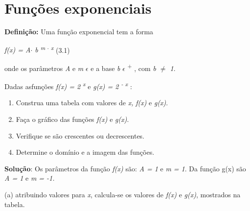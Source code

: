\section{Funções exponenciais}

\begin{caixa}
\textbf{Definição:} Uma função exponencial tem a forma

  \textit{f(x) = A$ \cdot $  b \textsuperscript{m $ \cdot $  x      }} (3.1)

onde os parâmetros  \textit{A }e \textit{m} $ \epsilon $    e a base \textit{b} $ \epsilon $  \textsuperscript{+}  , com \textit{b $ \neq $  1}.
\end{caixa}

\begin{texemplo}
Dadas asfunções   \textit{f(x) =  2\textsuperscript{ x}} e \textit{g(x) =  2\textsuperscript{ - x}} :

\begin{enumerate}
	\item Construa uma tabela com valores de \textit{x, } \textit{f(x)} e \textit{g(x)}.

	\item Faça o gráfico das funções  \textit{f(x)} e \textit{g(x)}.

	\item Verifique se são crescentes ou decrescentes.

	\item Determine o domínio e a imagem das funções.
\end{enumerate}

\textbf{Solução}: Os parâmetros da função \textit{f(x)} são: \textit{A = 1} e \textit{m = 1}. Da função g(x) são \textit{A = 1} e \textit{m = -1.}

(a) atribuindo valores para \textit{x}, calcula-se os valores de \textit{f(x)} e \textit{g(x)}, mostrados na tabela. 


\end{texemplo}
